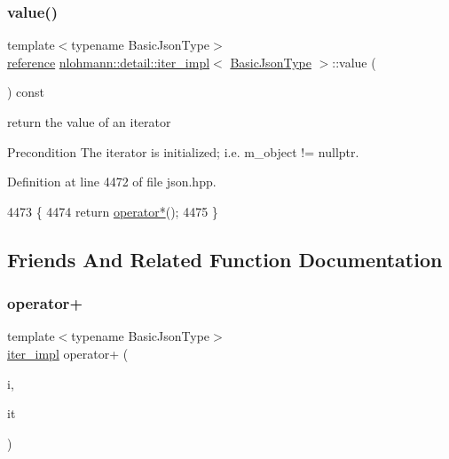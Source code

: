 \subsubsection{\texorpdfstring{value()}{value()}}
{\footnotesize\ttfamily template$<$typename Basic\+Json\+Type$>$ \\
\hyperlink{classnlohmann_1_1detail_1_1iter__impl_a5be8001be099c6b82310f4d387b953ce}{reference} \hyperlink{classnlohmann_1_1detail_1_1iter__impl}{nlohmann\+::detail\+::iter\+\_\+impl}$<$ \hyperlink{classnlohmann_1_1detail_1_1iter__impl_abf18f18793f84b0222aebb5a2a87da7a}{Basic\+Json\+Type} $>$\+::value (\begin{DoxyParamCaption}{ }\end{DoxyParamCaption}) const\hspace{0.3cm}{\ttfamily [inline]}}



return the value of an iterator 

\begin{DoxyPrecond}{Precondition}
The iterator is initialized; i.\+e. {\ttfamily m\+\_\+object != nullptr}. 
\end{DoxyPrecond}


Definition at line 4472 of file json.\+hpp.


\begin{DoxyCode}
4473     \{
4474         \textcolor{keywordflow}{return} \hyperlink{classnlohmann_1_1detail_1_1iter__impl_a5ca57856d9bba54a5fc51cee891de827}{operator*}();
4475     \}
\end{DoxyCode}


\subsection{Friends And Related Function Documentation}
\mbox{\label{classnlohmann_1_1detail_1_1iter__impl_a94108d1a7563e103534f23eb5c1ee175}} 
\subsubsection{\texorpdfstring{operator+}{operator+}}
{\footnotesize\ttfamily template$<$typename Basic\+Json\+Type$>$ \\
\hyperlink{classnlohmann_1_1detail_1_1iter__impl}{iter\+\_\+impl} operator+ (\begin{DoxyParamCaption}\item[{\hyperlink{classnlohmann_1_1detail_1_1iter__impl_a2f7ea9f7022850809c60fc3263775840}{difference\+\_\+type}}]{i,  }\item[{const \hyperlink{classnlohmann_1_1detail_1_1iter__impl}{iter\+\_\+impl}$<$ \hyperlink{classnlohmann_1_1detail_1_1iter__impl_abf18f18793f84b0222aebb5a2a87da7a}{Basic\+Json\+Type} $>$ \&}]{it }\end{DoxyParamCaption})\hspace{0.3cm}{\ttfamily [friend]}}



